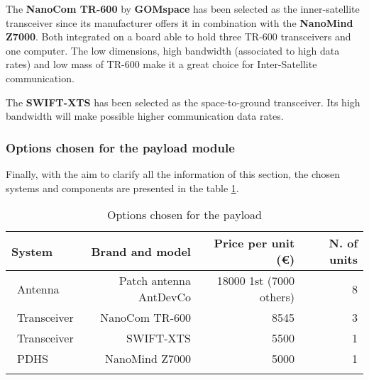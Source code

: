 The \textbf{NanoCom TR-600} by \textbf{GOMspace} has been selected as the inner-satellite transceiver since its manufacturer offers it in combination with the \textbf{NanoMind Z7000}. Both integrated on a board able to hold three TR-600 transceivers and one computer. The low dimensions, high bandwidth (associated to high data rates) and low mass of TR-600 make it a great choice for Inter-Satellite communication. \cite[Chapter 1, Section 5]{annex4}

The \textbf{SWIFT-XTS} has been selected as the space-to-ground transceiver. Its high bandwidth will make possible higher communication data rates. \cite[Chapter 1, Section 5]{annex4}

\subsubsection{Options chosen for the payload module}

Finally, with the aim to clarify all the information of this section, the chosen systems and components are presented in the table \ref{payloadchosen}.

\begin{longtable}{| l | r | r | r |}
	\hline
	\rowcolor[gray]{0.80}	\textbf{System} &  \textbf{Brand and model}     & \textbf{Price per unit (\euro)} & \textbf{N. of units}  \\
	\hline
	\endfirsthead
	
	~Antenna & Patch antenna AntDevCo & 18000 1st (7000 others) & 8 \\
	~Transceiver & NanoCom TR-600 & 8545 & 3 \\
	~Transceiver & SWIFT-XTS & 5500 &1\\
	~PDHS & NanoMind Z7000 & 5000 & 1 \\
	\hline
	
\caption{Options chosen for the payload}
\label{payloadchosen}
\end{longtable}